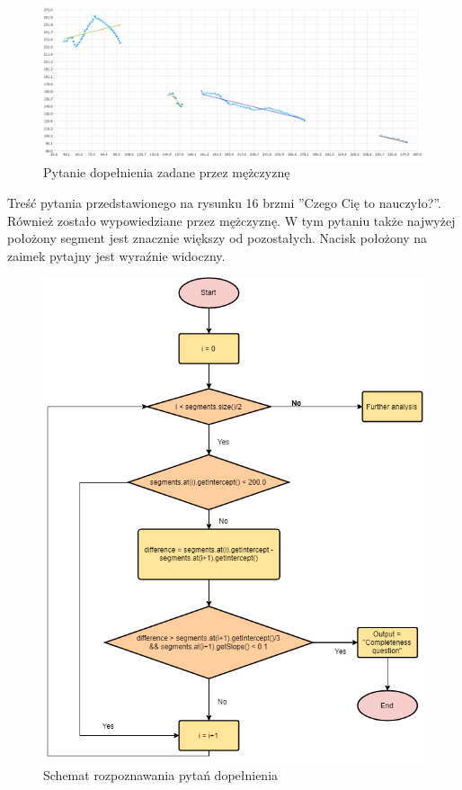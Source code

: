 \documentclass[a4paper,12 pt]{report}
\begin{document}
 \FloatBarrier
\begin{figure}[h]
\centering
\includegraphics[scale=0.55]{pytanie_dopelnienia_2.png}
\caption{Pytanie dopełnienia zadane przez mężczyznę}
\end{figure}
\FloatBarrier
Treść pytania przedstawionego na rysunku 16 brzmi ''Czego Cię to nauczyło?''. Również zostało wypowiedziane przez mężczyznę. W tym pytaniu także najwyżej położony segment jest znacznie większy od pozostałych. Nacisk położony na zaimek pytajny jest wyraźnie widoczny.
 \FloatBarrier
\begin{figure}[h]
\centering
\includegraphics[scale=0.85]{completeness.png}
\caption{Schemat rozpoznawania pytań dopełnienia}
\end{figure}
\end{document}
